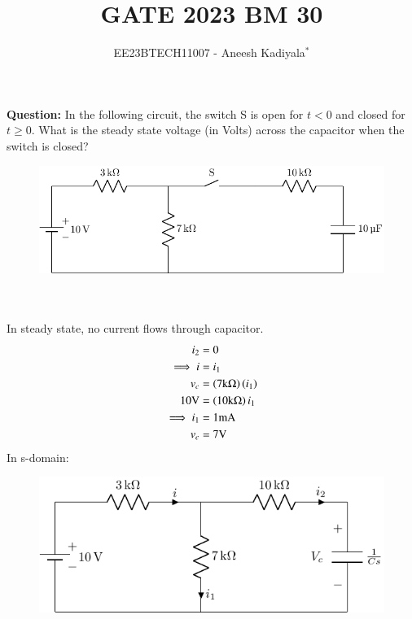 \documentclass[journal,12pt,twocolumn]{IEEEtran}
\theoremstyle{remark}
\begin{document}

\vspace{3cm}

\title{GATE 2023 BM 30}
\author{EE23BTECH11007 - Aneesh Kadiyala$^{*}$%
}
\maketitle
\newpage
\bigskip

\renewcommand{\thefigure}{\theenumi}
\renewcommand{\thetable}{\theenumi}

\vspace{3cm}
\textbf{Question:} In the following circuit, the switch S is open for $t < 0$ and closed for $t \ge 0$.
What is the steady state voltage (in Volts) across the capacitor when the switch is closed?
\begin{figure}[h!]
    \centering
    \includegraphics[width = \columnwidth]{figs/c_fig1.pdf}
\end{figure}
\\
\solution
\\
In steady state, no current flows through capacitor.
\begin{align}
i_2 &= 0 \\
\implies i &= i_1 \\
v_c &= \left(7\text{k}\ohm\right)\left(i_1\right) \\
10\text{V} &= \left(10\text{k}\ohm\right){i_1} \\
\implies i_1 &= 1\text{mA} \\
v_c &= 7\text{V}
\end{align}
In s-domain:
\begin{figure}[h!]
    \centering
    \includegraphics[width=\columnwidth]{figs/c_fig2.pdf}
\end{figure}
\end{document}
